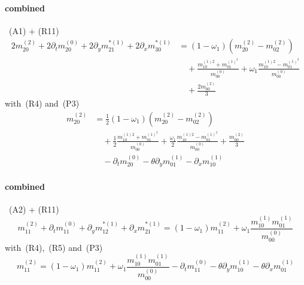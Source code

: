 \documentclass{article}
\begin{document}
  \paragraph{combined}~(A1) + (R11)
  \begin{equation*}
    \begin{aligned}
      2m_{20}^{(2)} + 2\partial_t m_{20}^{(0)} + 2\partial_y m_{21}^{*(1)} + 2\partial_x m_{30}^{*(1)}
      &= (1-\omega_1) \left(m_{20}^{(2)}-m_{02}^{(2)}\right)
      \\&\quad
      + \frac{ m_{10}^{(1)2} + m_{01}^{{(1)}^2}}{m_{00}^{(0)}} + \omega_1 \frac{ m_{10}^{(1)2} - m_{01}^{{(1)}^2}}{m_{00}^{(0)}}
      \\&\quad
      + \frac{2 m_{00}^{(2)}}{3}
    \end{aligned}
  \end{equation*}
  with~(R4) and~(P3)
  \begin{equation}
    \tag{C1}
    \begin{aligned}
      m_{20}^{(2)} &= \frac{1}{2}(1-\omega_1) \left(m_{20}^{(2)}-m_{02}^{(2)}\right)
      \\&\quad
      + \frac{1}{2}\frac{ m_{10}^{(1)2} + m_{01}^{{(1)}^2}}{m_{00}^{(0)}} + \frac{\omega_1}{2} \frac{ m_{10}^{(1)2} - m_{01}^{{(1)}^2}}{m_{00}^{(0)}}
      + \frac{m_{00}^{(2)}}{3}
      \\&\quad
      - \partial_t m_{20}^{(0)} - \theta\partial_y m_{01}^{(1)} - \partial_x m_{10}^{(1)}
    \end{aligned}
  \end{equation}
  \paragraph{combined}~(A2) + (R11)
  \begin{equation*}
    m_{11}^{(2)} + \partial_t m_{11}^{(0)} + \partial_y m_{12}^{*(1)} + \partial_x m_{21}^{*(1)} = (1-\omega_1)m_{11}^{(2)} + \omega_1 \frac{ m_{10}^{(1)}m_{01}^{(1)}}{m_{00}^{(0)}}
  \end{equation*}
  with~(R4),~(R5) and~(P3)
  \begin{equation}
    \tag{C2}
    m_{11}^{(2)} = (1-\omega_1)m_{11}^{(2)} + \omega_1 \frac{ m_{10}^{(1)}m_{01}^{(1)}}{m_{00}^{(0)}}  - \partial_t m_{11}^{(0)} - \theta\partial_y m_{10}^{(1)} - \theta\partial_x m_{01}^{(1)}
  \end{equation}
  \pagebreak
\end{document}
